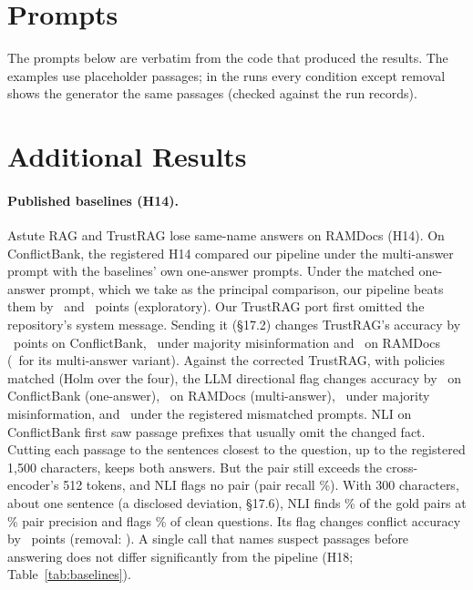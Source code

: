 \section{Prompts}
\label{app:prompts}
The prompts below are verbatim from the code that produced the results. The examples use placeholder passages; in the runs every condition except removal shows the generator the same passages (checked against the run records).


\section{Additional Results}
\label{app:extra}

\paragraph{Published baselines (H14).} Astute RAG \citep{wang2025astute} and TrustRAG \citep{zhou2025trustrag} lose same-name answers
on RAMDocs (H14). On ConflictBank, the registered H14 compared our pipeline under the multi-answer prompt with the
baselines' own one-answer prompts. Under the matched one-answer prompt, which we take as the principal comparison, our pipeline beats them by
\hFourteenMatchedAst\ and \hFourteenMatchedTr\ points (exploratory). Our TrustRAG port
first omitted the repository's system message. Sending it (\S17.2) changes TrustRAG's accuracy by \blTrustSysCb\
points on ConflictBank, \blTrustSysMj\ under majority misinformation and \blTrustSysRd\ on RAMDocs (\blTrustSysRdMulti\
for its multi-answer variant). Against the corrected TrustRAG, with policies matched (Holm over the four), the LLM
directional flag changes accuracy by \blHFourteenCbs\ on ConflictBank (one-answer), \blHFourteenRd\ on RAMDocs (multi-answer),
\blHFourteenMj\ under majority misinformation, and \blHFourteenCb\ under the registered mismatched prompts.
NLI on ConflictBank first saw passage prefixes that usually omit the changed fact. Cutting each passage to the
sentences closest to the question, up to the registered 1,500 characters, keeps both answers. But the
pair still exceeds the cross-encoder's 512 tokens, and NLI flags no pair (pair recall \detNliWinRecall\%). With
300 characters, about one sentence (a disclosed deviation, \S17.6), NLI finds \detNliSentRecall\% of the gold pairs at
\detNliSentPrec\% pair precision and flags \detNliSentCleanFpr\% of clean questions. Its flag changes conflict
accuracy by \blNliSentFlag\ points (removal: \blNliSentRem). A single call that names suspect passages before
answering does not differ significantly from the pipeline (H18; Table~\ref{tab:baselines}).

